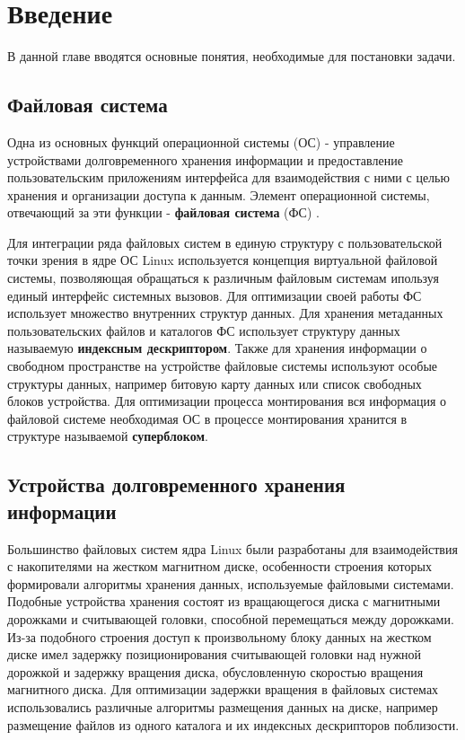 \section{Введение}
\label{sec:Chapter0} 

В данной главе вводятся основные понятия, необходимые для постановки задачи.

\subsection{Файловая система}

Одна из основных функций операционной системы (ОС) - управление устройствами долговременного хранения информации и предоставление пользовательским приложениям интерфейса для взаимодействия с ними с целью хранения и организации доступа к данным. Элемент операционной системы, отвечающий за эти функции - \textbf{файловая система} (ФС) \cite{osbook}. 

Для интеграции ряда файловых систем в единую структуру с пользовательской точки зрения в ядре ОС Linux используется концепция виртуальной файловой системы, позволяющая обращаться к различным файловым системам ипользуя единый интерфейс системных вызовов. Для оптимизации своей работы ФС использует множество внутренних структур данных. Для хранения метаданных пользовательских файлов и каталогов ФС использует структуру данных называемую \textbf{индексным дескриптором}. Также для хранения информации о свободном пространстве на устройстве файловые системы используют особые структуры данных, например битовую карту данных или список свободных блоков устройства. Для оптимизации процесса монтирования вся информация о файловой системе необходимая ОС в процессе монтирования хранится в структуре называемой \textbf{суперблоком}.

\subsection{Устройства долговременного хранения информации}

Большинство файловых систем ядра Linux были разработаны для взаимодействия с накопителями на жестком магнитном диске, особенности строения которых формировали алгоритмы хранения данных, используемые файловыми системами. Подобные устройства хранения состоят из вращающегося диска с магнитными дорожками и считывающей головки, способной перемещаться между дорожками. Из-за подобного строения доступ к произвольному блоку данных на жестком диске имел задержку позиционирования считывающей головки над нужной дорожкой и задержку вращения диска, обусловленную скоростью вращения магнитного диска. Для оптимизации задержки вращения в файловых системах использовались различные алгоритмы размещения данных на диске, например размещение файлов из одного каталога и их индексных дескрипторов поблизости.

